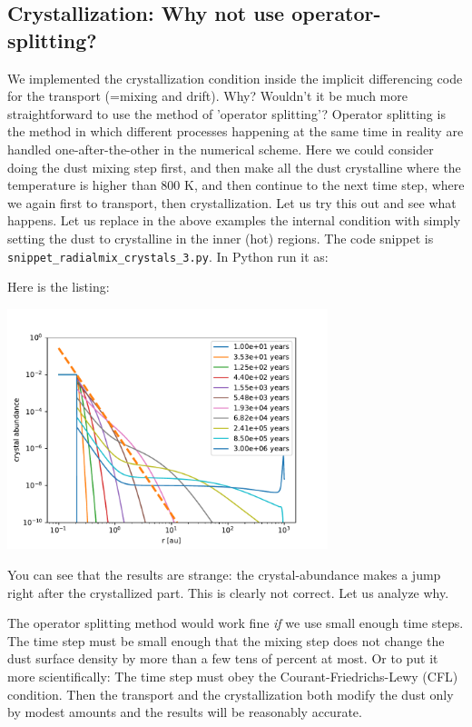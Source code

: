 \documentclass{book}
\newcommand{\code}[1]{{\small\tt #1}}
\begin{document}
\subsection{Crystallization: Why not use operator-splitting?}
We implemented the crystallization condition inside the implicit differencing
code for the transport (=mixing and drift). Why? Wouldn't it be much more
straightforward to use the method of 'operator splitting'? Operator splitting is
the method in which different processes happening at the same time in reality
are handled one-after-the-other in the numerical scheme. Here we could consider
doing the dust mixing step first, and then make all the dust crystalline where
the temperature is higher than 800 K, and then continue to the next time step,
where we again first to transport, then crystallization. Let us try this out
and see what happens. Let us replace in the above examples the
internal condition with simply setting the dust to crystalline in the inner
(hot) regions. The code snippet is \code{snippet\_radialmix\_crystals\_3.py}. In
Python run it as:
\begin{codebox}
\end{codebox}
Here is the listing:

\centerline{\includegraphics[width=0.7\textwidth]{../snippets/fig_snippet_radialmix_crystals_3_1.pdf}}
You can see that the results are strange: the crystal-abundance makes a jump
right after the crystallized part. This is clearly not correct. Let us analyze
why.

The operator splitting method would work fine {\em if} we use small enough time
steps. The time step must be small enough that the mixing step does not change
the dust surface density by more than a few tens of percent at most. Or to put
it more scientifically: The time step must obey the Courant-Friedrichs-Lewy
(CFL) condition. Then the transport and the crystallization both modify the dust
only by modest amounts and the results will be reasonably accurate.
\end{document}
